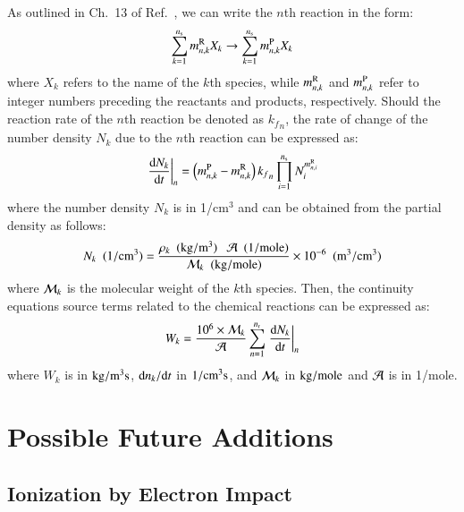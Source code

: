 \documentclass{warpdoc}
\let\citen\cite
\newcommand{\ns}{{{n}_{\rm s}}}
\begin{document}
As outlined in Ch.\ 13 of Ref.\ \citen{book:1989:anderson}, we can write the $n$th reaction in the form:
%
\begin{equation}
  \sum_{k=1}^\ns m_{n,k}^{\rm R} X_k \rightarrow \sum_{k=1}^\ns m_{n,k}^{\rm P} X_k
\end{equation}
%
where $X_k$ refers to the name of the $k$th species, while $m_{n,k}^{\rm R}$ and $m_{n,k}^{\rm P}$
refer to integer numbers preceding the reactants and products, respectively. 
 Should the reaction rate of the $n$th reaction be denoted as ${k_f}_n$,
the rate of change of the number density $N_{k}$ due to the $n$th reaction can be expressed as:
%
\begin{equation}
  \left. \frac{{\rm d} N_{k}}{{\rm d} t} \right|_n = \left( m_{n,k}^{\rm P} - m_{n,k}^{\rm R} \right) {k_f}_n \prod_{i=1}^\ns N_{i}^{m_{n,i}^{\rm R}}
\end{equation}
%
where the number density $N_{k}$ is in  1/cm$^3$ and can be obtained from the partial density as follows:
%
\begin{equation}
  N_{k} {\rm ~~(1/cm^3)}= \frac{\rho_k {\rm ~~(kg/m^3)}~~~{\cal A ~~{\rm (1/mole)}}}{{\cal M}_k {\rm ~~(kg/mole)}} \times 10^{-6} {\rm ~~(m^3/cm^3)}
\end{equation}
%
where ${\cal M}_k$ is the molecular weight of the $k$th species. 
Then, the continuity equations source terms related to the chemical reactions can be expressed as:
%
\begin{equation}
 W_k  = \frac{10^6 \times {\cal M}_k}{\cal A} \sum_{n=1}^{n_{\rm r}} \left. \frac{{\rm d} N_{k}}{{\rm d} t} \right|_n     
\end{equation}
%
where $W_k$ is in $\rm kg/m^3 s$, ${{\rm d} n_k}/{{\rm d} t}$ in $\rm 1/cm^3 s$, and ${\cal M}_k$ in $\rm kg/mole$ and $\cal A$ is in 1/mole.


\section{Possible Future Additions}


\subsection{Ionization by Electron Impact}
\end{document}

